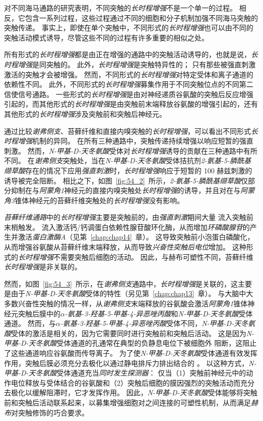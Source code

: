 对不同海马通路的研究表明，不同突触的\textit{长时程增强}不是一个单一的过程。
相反，它包含一系列过程，这些过程通过不同的细胞和分子机制加强不同海马突触的突触传递。
事实上，即使在单个突触中，不同形式的\textit{长时程增强}也可以由不同的突触活动模式诱导，尽管这些不同的过程有许多重要的相似之处。


所有形式的\textit{长时程增强}都是由正在增强的通路中的突触活动诱导的，也就是说，\textit{长时程增强}是同突触的。
此外，\textit{长时程增强}是突触特异性的；
只有那些被强直刺激激活的突触才会被增强。
然而，不同形式的\textit{长时程增强}对特定受体和离子通道的依赖性不同。
此外，不同形式的\textit{长时程增强}募集作用于不同突触位点的不同第二信使信号通路。
一些形式的\textit{长时程增强}是由对神经递质谷氨酸的突触后反应增强引起的，而其他形式的\textit{长时程增强}是由突触前末端释放谷氨酸的增强引起的，还有其他形式的\textit{长时程增强}涉及突触前和突触后神经元。


通过比较\textit{谢弗侧支}、苔藓纤维和直接内嗅突触的\textit{长时程增强}，可以看出不同形式\textit{长时程增强}机制的异同。
在所有三种通路中，突触传递持续增强以响应短暂的强直刺激。
然而，\textit{N-甲基-D-天冬氨酸}受体对\textit{长时程增强}诱导的贡献在三种通路中有所不同。
在\textit{谢弗侧支}突触处，当在\textit{N-甲基-D-天冬氨酸}受体拮抗剂\textit{2-氨基-5-膦酰基缬草酸}存在的情况下应用\textit{强直刺激}时，\textit{长时程增强}响应于短暂的 100 赫兹刺激的诱导被完全阻断。
相比之下，如图~\ref{fig:54_2}~所示，\textit{2-氨基-5-膦酰基缬草酸}仅部分抑制在与\textit{阿蒙角1}神经元的直接内嗅突触处\textit{长时程增强}的诱导，并且对在与\textit{阿蒙角3}锥体神经元的苔藓纤维突触处的\textit{长时程增强}没有影响。


\textit{苔藓纤维通路}中的\textit{长时程增强}主要是突触前的，由\textit{强直刺激}期间大量  流入突触前末梢触发。
 流入激活钙/钙调蛋白依赖性腺苷酸环化酶，从而增加\textit{环磷酸腺苷}的产生并激活\textit{蛋白激酶A}（见第~\ref{chap:chap14}~章）。
这导致突触前小泡蛋白磷酸化，从而增强谷氨酸从苔藓纤维末端释放，从而导致\textit{兴奋性突触后电位}增加。
这种形式的\textit{长时程增强}不需要突触后细胞的活动。
因此，与赫布可塑性不同，苔藓纤维\textit{长时程增强}是非关联的。


然而，如图~\ref{fig:54_3}~所示，在\textit{谢弗侧支}通路中，\textit{长时程增强}是关联的，这主要是由于\textit{N-甲基-D-天冬氨酸}受体的特性（另见第~\ref{chap:chap13}~章）。
与大脑中大多数兴奋性突触的情况一样，从\textit{谢弗侧支}末端释放的谷氨酸会激活\textit{阿蒙角1}锥体神经元突触后膜中的\textit{$\alpha$-氨基-3-羟基-5-甲基-4-异恶唑丙酸}和\textit{N-甲基-D-天冬氨酸}受体通道。
然而，与\textit{$\alpha$-氨基-3-羟基-5-甲基-4-异恶唑丙酸}受体不同，\textit{N-甲基-D-天冬氨酸}受体的激活是相关的，因为它需要同时进行突触前和突触后活动。
这是因为\textit{N-甲基-D-天冬氨酸}受体通道的孔通常在典型的负静息电位下被细胞外  阻断，这阻止了这些通道响应谷氨酸而传导离子。
为了使\textit{N-甲基-D-天冬氨酸}受体通道有效发挥作用，突触后膜必须充分去极化以通过静电排斥力排出结合的 。
以这种方式，\textit{N-甲基-D-天冬氨酸}受体通道充当\textit{同时发生探测器}：
仅当（1）突触前神经元中的动作电位释放与受体结合的谷氨酸和（2）突触后细胞的膜因强烈的突触活动而充分去极化以缓解阻滞时，它才发挥作用。
因此，\textit{N-甲基-D-天冬氨酸}受体能够将突触前和突触后活动联系起来，以募集增强细胞对之间连接的可塑性机制，从而满足\textit{赫布}对突触修饰的巧合要求。


